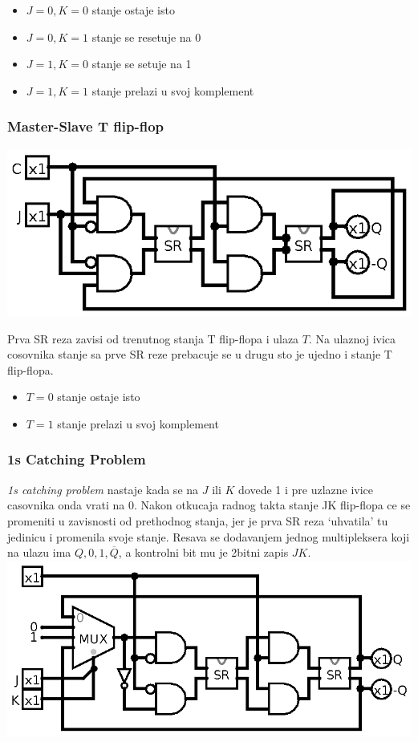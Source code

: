 \documentclass[12p,a4paper]{article}
\begin{document}
\begin{multicols}{2}
    \begin{itemize}
        \itemsep0em
        \item $J = 0, K = 0$ stanje ostaje isto
        \item $J = 0, K = 1$ stanje se resetuje na 0
        \item $J = 1, K = 0$ stanje se setuje na 1
        \item $J = 1, K = 1$ stanje prelazi u svoj komplement
    \end{itemize}

    \subsubsection{Master-Slave T flip-flop}

    \includegraphics[width=0.9\columnwidth]{Figures/t_ms_flipflop.png}

    Prva SR reza zavisi od trenutnog stanja T flip-flopa i ulaza $T$. Na
    ulaznoj ivica cosovnika stanje sa prve SR reze prebacuje se u drugu sto je
    ujedno i stanje T flip-flopa.

    \begin{itemize}
        \itemsep0em
        \item $T = 0$ stanje ostaje isto
        \item $T = 1$ stanje prelazi u svoj komplement
    \end{itemize}

    \subsubsection{1s Catching Problem}

    \emph{1s catching problem} nastaje kada se na $J$ ili $K$ dovede 1 i pre
    uzlazne ivice casovnika onda vrati na 0. Nakon otkucaja radnog takta 
    stanje JK flip-flopa ce se promeniti u zavisnosti od prethodnog stanja, 
    jer je prva SR reza `uhvatila' tu jedinicu i promenila svoje stanje. 
    Resava se dodavanjem jednog multipleksera koji na ulazu ima 
    $Q, 0, 1, \overline{Q}$, a kontrolni bit mu je 2bitni zapis $JK$.
    \includegraphics[width=\columnwidth]{Figures/jk_ms_flipflop_1s.png}


\end{multicols}
\end{document}
